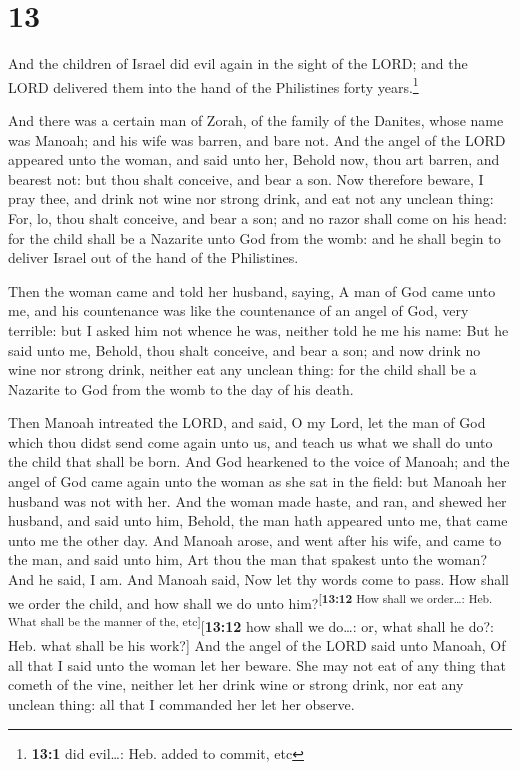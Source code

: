 \hypertarget{section-12}{%
\section{13}\label{section-12}}

 And the children of Israel did evil again in the sight of
the LORD; and the LORD delivered them into the hand of the Philistines
forty years.\footnote{\textbf{13:1} did evil\ldots: Heb. added to
  commit, etc}

 And there was a certain man of Zorah, of the family of
the Danites, whose name was Manoah; and his wife was barren, and bare
not.  And the angel of the LORD appeared unto the woman,
and said unto her, Behold now, thou art barren, and bearest not: but
thou shalt conceive, and bear a son.  Now therefore
beware, I pray thee, and drink not wine nor strong drink, and eat not
any unclean thing:  For, lo, thou shalt conceive, and bear
a son; and no razor shall come on his head: for the child shall be a
Nazarite unto God from the womb: and he shall begin to deliver Israel
out of the hand of the Philistines.

 Then the woman came and told her husband, saying, A man
of God came unto me, and his countenance was like the countenance of an
angel of God, very terrible: but I asked him not whence he was, neither
told he me his name:  But he said unto me, Behold, thou
shalt conceive, and bear a son; and now drink no wine nor strong drink,
neither eat any unclean thing: for the child shall be a Nazarite to God
from the womb to the day of his death.

 Then Manoah intreated the LORD, and said, O my Lord, let
the man of God which thou didst send come again unto us, and teach us
what we shall do unto the child that shall be born.  And
God hearkened to the voice of Manoah; and the angel of God came again
unto the woman as she sat in the field: but Manoah her husband was not
with her.  And the woman made haste, and ran, and shewed
her husband, and said unto him, Behold, the man hath appeared unto me,
that came unto me the other day.  And Manoah arose, and
went after his wife, and came to the man, and said unto him, Art thou
the man that spakest unto the woman? And he said, I am. 
And Manoah said, Now let thy words come to pass. How shall we order the
child, and how shall we do unto him?\textsuperscript{{[}\textbf{13:12}
How shall we order\ldots: Heb. What shall be the manner of the,
etc{]}}{[}\textbf{13:12} how shall we do\ldots: or, what shall he do?:
Heb. what shall be his work?{]}  And the angel of the
LORD said unto Manoah, Of all that I said unto the woman let her beware.
 She may not eat of any thing that cometh of the vine,
neither let her drink wine or strong drink, nor eat any unclean thing:
all that I commanded her let her observe.

